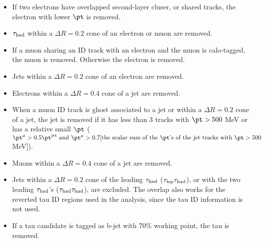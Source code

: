 \begin{itemize}
\item If two electrons have overlapped second-layer cluser, or shared tracks, the electron with lower $\pt$ is removed.
\item $\tau_\text{had}$ within a $\Delta R=0.2$ cone of an electron or muon are removed.
\item If a muon sharing an ID track with an electron and the muon is calo-tagged, the muon is removed. Otherwise the electron is removed.
\item Jets within a $\Delta R=0.2$ cone of an electron are removed.
\item Electrons within a $\Delta R=0.4$ cone of a jet are removed.
\item When a muon ID track is ghost associated to a jet or within a $\Delta R=0.2$ cone of a jet, the jet is removed if it has less than 3 tracks with $\pt>500$ MeV or has a relative small $\pt$ ($\pt^{\mu}>0.5\pt^{\text{jet}} \text{ and } \pt^{\mu}>0.7[\text{the scalar sum of the } \pt \text{'s of the jet tracks with } \pt>500$ MeV]).
\item Muons within a $\Delta R=0.4$ cone of a jet are removed.
\item Jets within a $\Delta R=0.2$ cone of the leading $\tau_\text{had}$ ($\tau_\text{lep}{}\tau_\text{had}$), or with the two leading $\tau_\text{had}$'s ($\tau_\text{had}{}\tau_\text{had}$), are excluded. The overlap also works for the reverted tau ID regions used in the analysis, since the tau ID information is not used.
\item If a tau candidate is tagged as b-jet with 70\% working point, the tau is removed.
\end{itemize}


